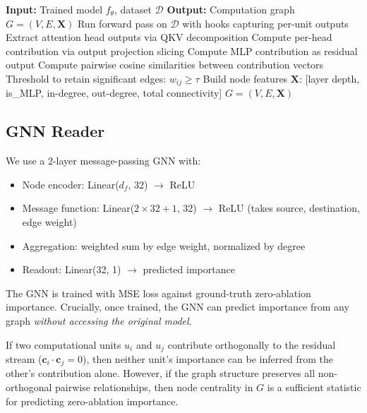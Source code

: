 \documentclass[11pt]{article}
\begin{document}
\begin{algorithm}[t]
\caption{GNOmE Circuit Extraction}
\label{alg:extraction}
\begin{algorithmic}[1]
\STATE \textbf{Input:} Trained model $f_\theta$, dataset $\mathcal{D}$
\STATE \textbf{Output:} Computation graph $G = (V, E, \mathbf{X})$
\STATE Run forward pass on $\mathcal{D}$ with hooks capturing per-unit outputs
    \STATE Extract attention head outputs via QKV decomposition
    \STATE Compute per-head contribution via output projection slicing
    \STATE Compute MLP contribution as residual output
\ENDFOR
\STATE Compute pairwise cosine similarities between contribution vectors
\STATE Threshold to retain significant edges: $w_{ij} \geq \tau$
\STATE Build node features $\mathbf{X}$: [layer depth, is\_MLP, in-degree, out-degree, total connectivity]
\RETURN $G = (V, E, \mathbf{X})$
\end{algorithmic}
\end{algorithm}

\subsection{GNN Reader}

We use a 2-layer message-passing GNN with:
\begin{itemize}
    \item Node encoder: Linear($d_f$, 32) $\to$ ReLU
    \item Message function: Linear($2 \times 32 + 1$, 32) $\to$ ReLU (takes source, destination, edge weight)
    \item Aggregation: weighted sum by edge weight, normalized by degree
    \item Readout: Linear(32, 1) $\to$ predicted importance
\end{itemize}

The GNN is trained with MSE loss against ground-truth zero-ablation importance. Crucially, once trained, the GNN can predict importance from any graph \emph{without accessing the original model}.

\begin{theorem}\label{thm:extraction}
If two computational units $u_i$ and $u_j$ contribute orthogonally to the residual stream ($\mathbf{c}_i \cdot \mathbf{c}_j = 0$), then neither unit's importance can be inferred from the other's contribution alone. However, if the graph structure preserves all non-orthogonal pairwise relationships, then node centrality in $G$ is a sufficient statistic for predicting zero-ablation importance.
\end{theorem}
\end{document}
